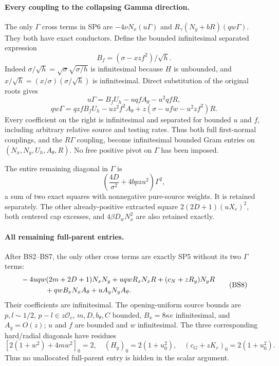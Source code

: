 \paragraph{Every coupling to the collapsing Gamma direction.}
The only $\Gamma$ cross terms in SP6 are
$-4\nu N_x(u\Gamma)$ and
$R_\gamma(N_y+bR)(qw\Gamma)$. They both have exact conductors.
Define the bounded infinitesimal separated expression
\[
 B_f=(\sigma-xzf^2)/\sqrt h.
\]
Indeed $\sigma/\sqrt h=\sqrt{\sigma}\sqrt{\sigma/h}$ is infinitesimal
because $H$ is unbounded, and
$x/\sqrt h=(x/\sigma)(\sigma/\sqrt h)$ is infinitesimal.
Direct substitution of the original roots gives
\[
 u\Gamma=B_fU_h-uqfA_\theta-u^2qfR,                 \tag{BS5}
\]
\[
 qw\Gamma=qzfB_fU_h-uz^2f^2A_\theta
                  +z(\sigma-ufw-u^2zf^2)R.         \tag{BS6}
\]
Every coefficient on the right is infinitesimal and separated for
bounded $u$ and $f$, including arbitrary relative source and testing
rates. Thus both full first-normal couplings, and the $R\Gamma$
coupling, become infinitesimal bounded Gram entries on
$(N_x,N_y,U_h,A_\theta,R)$. No free positive pivot on $\Gamma$
has been imposed.

The entire remaining diagonal in $\Gamma$ is
\[
 \left(\frac{4D}{\sigma^2}+4bpzu^2\right)\Gamma^2,
 \tag{BS7}
\]
a sum of two exact squares with nonnegative pure-source weights.
It is retained separately. The other already-positive extracted square
$2(2D+1)(uX_e)^2$, both centered cap excesses, and
$4\beta D_wN_x^2$ are also retained exactly.

\paragraph{All remaining full-parent entries.}
After BS2--BS7, the only other cross terms are exactly SP5 without
its two $\Gamma$ terms:
\[
\begin{split}
 &-4uqw(2m+2D+1)N_xN_y
 +uqwR_xN_xR+(c_N+zR_y)N_yR\\
 &\hspace{12mm}+qwB_xN_xA_\theta+uA_yN_yA_\theta .
\end{split}                                                   \tag{BS8}
\]
Their coefficients are infinitesimal. The opening-uniform source
bounds are $p,l\sim1/2$, $p-l\in z\mathcal O_c$,
$m,D,b_\theta,C$ bounded, $B_x=8\kappa e$ infinitesimal, and
$A_y=O(z)$; $u$ and $f$ are bounded and $w$ infinitesimal.
The three corresponding hard/radial diagonals have residues
\[
 [2(1+w^2)+4mw^2]_0=2,\quad
 (H_y)_0=2(1+u_0^2),\quad
 (c_G+zK_r)_0=2(1+u_0^2).                          \tag{BS9}
\]
Thus no unallocated full-parent entry is hidden in the scalar argument.

